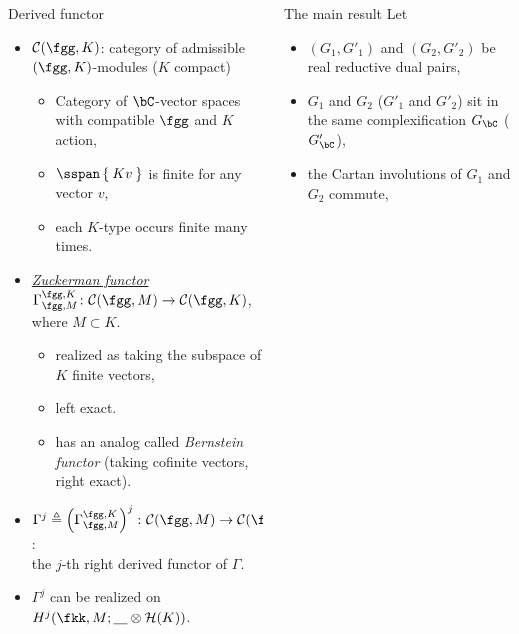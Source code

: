 \documentclass[final,hyperref={pdfpagelabels=false}]{beamer} %
\def\emph#1{{\em \underline{#1}}}
\def\cC{\mathcal{C}}
\begin{document}
\begin{frame}
\begin{columns}[t]
\begin{column}{.48\linewidth}
\begin{block}{Derived functor}
  \begin{itemize}
     \item $\cC(\fgg,K)$: category of admissible $(\fgg, K)$-modules ($K$ compact)
      \begin{itemize}
      \item Category of $\bC$-vector spaces  with compatible $\fgg$ and $K$ action,
      \item $\sspan\Set{Kv}$ is finite for any vector $v$,
      \item each $K$-type occurs finite many times.
      \end{itemize}
    \item \emph{Zuckerman functor}  $\Gamma_{\fgg,M}^{\fgg,K}
      \colon \cC(\fgg,M)\to \cC(\fgg,K)$, 
      where $M\subset K$.
      \begin{itemize}
      \item realized as taking the subspace of $K$ finite vectors,
      \item left exact.
      \item has an analog called {\em Bernstein functor} (taking cofinite vectors, right exact).
      \end{itemize}
    \item $\Gamma^j\triangleq\left(\Gamma_{\fgg,M}^{\fgg,K}\right)^j
      \colon \cC(\fgg,M)\to \cC(\fgg,K)$: \\
      the $j$-th right derived functor of $\Gamma$.
    \item $\Gamma^j$ can be realized on $H^j(\fkk,M; \underline{\hskip1em} \otimes \mathcal{H}(K))$.
    \end{itemize}
\end{block}
\end{column}
\begin{column}{.48\linewidth}
    \begin{block}{The main result}
      Let
      \begin{itemize}
      \item $(G_1,G'_1)$ and $(G_2,G'_2)$ be real reductive dual pairs,
      \item $G_1$ and $G_2$ ($G'_1$ and $G'_2$) sit in the same complexification $G_\bC$ ($G'_\bC$),
      \item the Cartan involutions of $G_1$ and $G_2$  commute,

\end{itemize}
\end{block}
\end{column}
\end{columns}
\end{frame}
\end{document}
